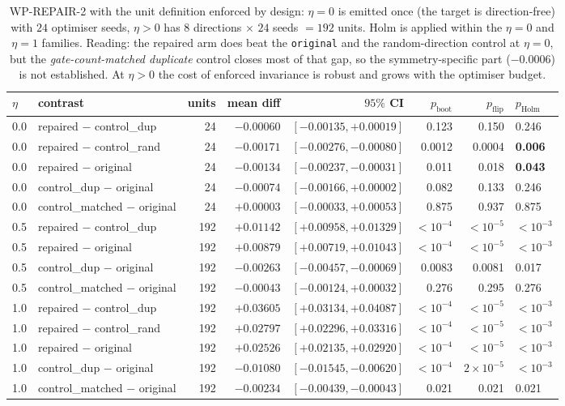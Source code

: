 \documentclass[11pt]{article}
\begin{document}
\begin{table}[t]
\centering
\caption{WP-REPAIR-2 with the unit definition enforced by design: $\eta{=}0$ is emitted
once (the target is direction-free) with $24$ optimiser seeds, $\eta{>}0$ has
$8$ directions $\times$ $24$ seeds $=192$ units. Holm is applied within the
$\eta{=}0$ and $\eta{=}1$ families. Reading: the repaired arm does beat the
\texttt{original} and the random-direction control at $\eta{=}0$, but the
\emph{gate-count-matched duplicate} control closes most of that gap, so the
symmetry-specific part ($-0.0006$) is not established. At $\eta{>}0$ the cost of enforced
invariance is robust and grows with the optimiser budget.}
\label{tab:rep2}
\small
\begin{tabular}{@{}llrrrrrl@{}}
\toprule
$\eta$ & contrast & units & mean diff & $95\%$ CI & $p_{\text{boot}}$ & $p_{\text{flip}}$ & $p_{\text{Holm}}$ \\
\midrule
0.0 & repaired $-$ control\_dup & 24 & $-0.00060$ & $[-0.00135,+0.00019]$ & 0.123 & 0.150 & 0.246 \\
0.0 & repaired $-$ control\_rand & 24 & $\mathbf{-0.00171}$ & $[-0.00276,-0.00080]$ & 0.0012 & 0.0004 & \textbf{0.006} \\
0.0 & repaired $-$ original & 24 & $\mathbf{-0.00134}$ & $[-0.00237,-0.00031]$ & 0.011 & 0.018 & \textbf{0.043} \\
0.0 & control\_dup $-$ original & 24 & $-0.00074$ & $[-0.00166,+0.00002]$ & 0.082 & 0.133 & 0.246 \\
0.0 & control\_matched $-$ original & 24 & $+0.00003$ & $[-0.00033,+0.00053]$ & 0.875 & 0.937 & 0.875 \\
\midrule
0.5 & repaired $-$ control\_dup & 192 & $+0.01142$ & $[+0.00958,+0.01329]$ & $<10^{-4}$ & $<10^{-5}$ & $<10^{-3}$ \\
0.5 & repaired $-$ original & 192 & $+0.00879$ & $[+0.00719,+0.01043]$ & $<10^{-4}$ & $<10^{-5}$ & $<10^{-3}$ \\
0.5 & control\_dup $-$ original & 192 & $-0.00263$ & $[-0.00457,-0.00069]$ & 0.0083 & 0.0081 & 0.017 \\
0.5 & control\_matched $-$ original & 192 & $-0.00043$ & $[-0.00124,+0.00032]$ & 0.276 & 0.295 & 0.276 \\
\midrule
1.0 & repaired $-$ control\_dup & 192 & $\mathbf{+0.03605}$ & $[+0.03134,+0.04087]$ & $<10^{-4}$ & $<10^{-5}$ & $<10^{-3}$ \\
1.0 & repaired $-$ control\_rand & 192 & $+0.02797$ & $[+0.02296,+0.03316]$ & $<10^{-4}$ & $<10^{-5}$ & $<10^{-3}$ \\
1.0 & repaired $-$ original & 192 & $+0.02526$ & $[+0.02135,+0.02920]$ & $<10^{-4}$ & $<10^{-5}$ & $<10^{-3}$ \\
1.0 & control\_dup $-$ original & 192 & $-0.01080$ & $[-0.01545,-0.00620]$ & $<10^{-4}$ & $2\times10^{-5}$ & $<10^{-3}$ \\
1.0 & control\_matched $-$ original & 192 & $-0.00234$ & $[-0.00439,-0.00043]$ & 0.021 & 0.021 & 0.021 \\
\bottomrule
\end{tabular}
\end{table}
\end{document}
